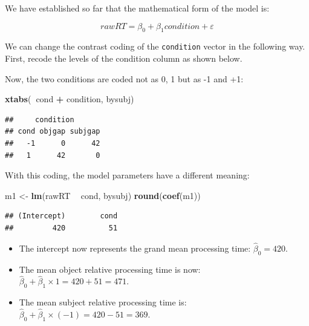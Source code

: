 \documentclass[12pt,]{krantz}
\newenvironment{Shaded}{\begin{snugshade}}{\end{snugshade}}
\newcommand{\CommentTok}[1]{\textcolor[rgb]{0.56,0.35,0.01}{\textit{#1}}}
\newcommand{\DecValTok}[1]{\textcolor[rgb]{0.00,0.00,0.81}{#1}}
\newcommand{\KeywordTok}[1]{\textcolor[rgb]{0.13,0.29,0.53}{\textbf{#1}}}
\newcommand{\NormalTok}[1]{#1}
\newcommand{\OperatorTok}[1]{\textcolor[rgb]{0.81,0.36,0.00}{\textbf{#1}}}
\newcommand{\StringTok}[1]{\textcolor[rgb]{0.31,0.60,0.02}{#1}}
\providecommand{\tightlist}{%
  \setlength{\itemsep}{0pt}\setlength{\parskip}{0pt}}
\begin{document}
We have established so far that the mathematical form of the model is:

\begin{equation}
rawRT = \beta_0 + \beta_1 condition + \varepsilon
\end{equation}

We can change the contrast coding of the \texttt{condition} vector in the following way. First, recode the levels of the condition column as shown below.

\begin{Shaded}
\end{Shaded}

Now, the two conditions are coded not as 0, 1 but as -1 and +1:

\begin{Shaded}
\begin{Highlighting}[]
\KeywordTok{xtabs}\NormalTok{(}\OperatorTok{~}\NormalTok{cond }\OperatorTok{+}\StringTok{ }\NormalTok{condition, bysubj)}
\end{Highlighting}
\end{Shaded}

\begin{verbatim}
##     condition
## cond objgap subjgap
##   -1      0      42
##   1      42       0
\end{verbatim}

With this coding, the model parameters have a different meaning:

\begin{Shaded}
\begin{Highlighting}[]
\NormalTok{m1 <-}\StringTok{ }\KeywordTok{lm}\NormalTok{(rawRT }\OperatorTok{~}\StringTok{ }\NormalTok{cond, bysubj)}
\KeywordTok{round}\NormalTok{(}\KeywordTok{coef}\NormalTok{(m1))}
\end{Highlighting}
\end{Shaded}

\begin{verbatim}
## (Intercept)        cond 
##         420          51
\end{verbatim}

\begin{itemize}
\tightlist
\item
  The intercept now represents the grand mean processing time: \(\hat \beta_0=420\).
\item
  The mean object relative processing time is now: \(\hat\beta_0+\hat\beta_1\times 1=420+51=471\).
\item
  The mean subject relative processing time is: \(\hat\beta_0+\hat\beta_1\times (-1)=420-51=369\).
\end{itemize}
\end{document}
